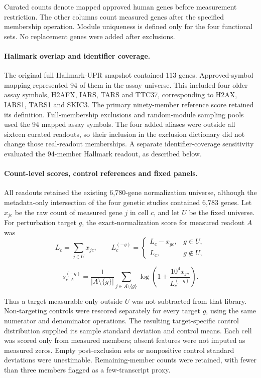 \documentclass[a4paper,fleqn]{cas-sc}
\makeatletter
\DeclareRobustCommand{\rev}[1]{{\color{red}\def\@citecolor{black}\def\@linkcolor{red}\def\@urlcolor{red}#1}}
\let\unmarkedcite\cite
\renewcommand{\cite}[1]{{\color{black}\def\@citecolor{black}\unmarkedcite{#1}}}
\makeatother
\begin{document}
\rev{Curated counts denote mapped approved human genes before measurement restriction.} \rev{The other columns count measured genes after the specified membership operation.} \rev{Module uniqueness is defined only for the four functional sets.} \rev{No replacement genes were added after exclusions.}

\paragraph{\rev{Hallmark overlap and identifier coverage.}}
\rev{The original full Hallmark-UPR snapshot contained 113 genes.\cite{liberzon2015}} \rev{Approved-symbol mapping represented 94 of them in the assay universe.} \rev{This included four older assay symbols, H2AFX, IARS, TARS and TTC37, corresponding to H2AX, IARS1, TARS1 and SKIC3.} \rev{The primary ninety-member reference score retained its definition.} \rev{Full-membership exclusions and random-module sampling pools used the 94 mapped assay symbols.} \rev{The four added aliases were outside all sixteen curated readouts, so their inclusion in the exclusion dictionary did not change those real-readout memberships.} \rev{A separate identifier-coverage sensitivity evaluated the 94-member Hallmark readout, as described below.}

\paragraph{\rev{Count-level scores, control references and fixed panels.}}
\rev{All readouts retained the existing 6,780-gene normalization universe, although the metadata-only intersection of the four genetic studies contained 6,783 genes.} \rev{Let $x_{jc}$ be the raw count of measured gene $j$ in cell $c$, and let $U$ be the fixed universe.} \rev{For perturbation target $g$, the exact-normalization score for measured readout $A$ was
{}
{}
{\color{red}
\[
 L_c=\sum_{j\in U}x_{jc},\qquad
 L_c^{(-g)}=
 \begin{cases}
 L_c-x_{gc}, & g\in U,\\
 L_c, & g\notin U,
 \end{cases}
\]
}
}

\rev{{
{}
{\color{red}
\[
 s_{c,A}^{(-g)}=
 \frac{1}{|A\setminus\{g\}|}
 \sum_{j\in A\setminus\{g\}}
 \log\!\left(1+\frac{10^4x_{jc}}{L_c^{(-g)}}\right).
\]
}
}

\rev{Thus a target measurable only outside $U$ was not subtracted from that library.} \rev{Non-targeting controls were rescored separately for every target $g$, using the same numerator and denominator operations.} \rev{The resulting target-specific control distribution supplied its sample standard deviation and control means.} \rev{Each cell was scored only from measured members; absent features were not imputed as measured zeros.} \rev{Empty post-exclusion sets or nonpositive control standard deviations were unestimable.} \rev{Remaining-member counts were retained, with fewer than three members flagged as a few-transcript proxy.}}
\end{document}
